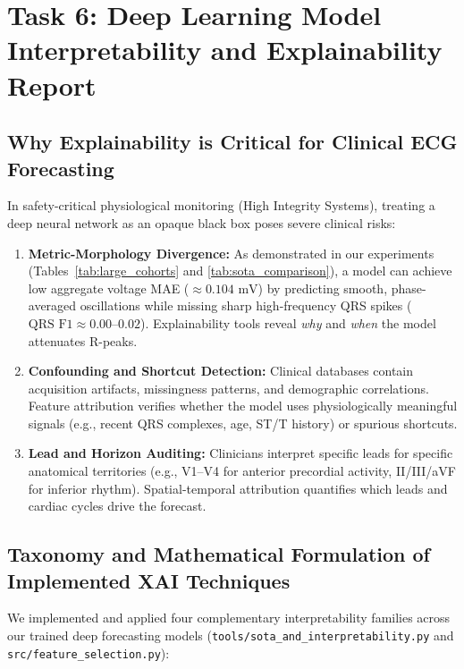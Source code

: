 \documentclass[11pt,a4paper]{article}
\begin{document}
\section{Task 6: Deep Learning Model Interpretability and Explainability Report}
\label{sec:interpretability}

\subsection{Why Explainability is Critical for Clinical ECG Forecasting}
In safety-critical physiological monitoring (High Integrity Systems), treating a deep neural network as an opaque black box poses severe clinical risks:
\begin{enumerate}
    \item \textbf{Metric-Morphology Divergence:} As demonstrated in our experiments (Tables~\ref{tab:large_cohorts} and \ref{tab:sota_comparison}), a model can achieve low aggregate voltage MAE ($\approx 0.104\text{ mV}$) by predicting smooth, phase-averaged oscillations while missing sharp high-frequency QRS spikes ($\text{QRS F1} \approx 0.00\text{--}0.02$). Explainability tools reveal \emph{why} and \emph{when} the model attenuates R-peaks.
    \item \textbf{Confounding and Shortcut Detection:} Clinical databases contain acquisition artifacts, missingness patterns, and demographic correlations. Feature attribution verifies whether the model uses physiologically meaningful signals (e.g., recent QRS complexes, age, ST/T history) or spurious shortcuts.
    \item \textbf{Lead and Horizon Auditing:} Clinicians interpret specific leads for specific anatomical territories (e.g., V1--V4 for anterior precordial activity, II/III/aVF for inferior rhythm). Spatial-temporal attribution quantifies which leads and cardiac cycles drive the forecast.
\end{enumerate}

\subsection{Taxonomy and Mathematical Formulation of Implemented XAI Techniques}
We implemented and applied four complementary interpretability families across our trained deep forecasting models (\texttt{tools/sota\_and\_interpretability.py} and \texttt{src/feature\_selection.py}):
\end{document}
